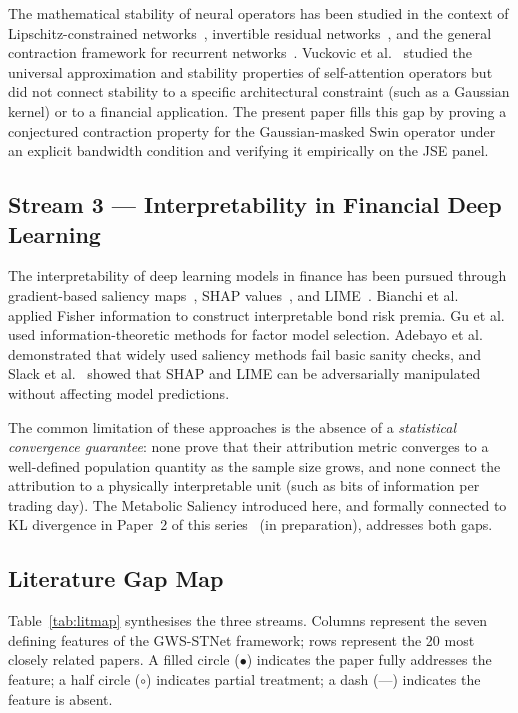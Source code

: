 \documentclass[11pt,a4paper]{article}  %
\theoremstyle{plain}
\theoremstyle{definition}
\theoremstyle{remark}
\begin{document}
The mathematical stability of neural operators has been studied
in the context of Lipschitz-constrained networks~\cite{Miyato2018},
invertible residual networks~\cite{Behrmann2019}, and the general
contraction framework for recurrent networks~\cite{Lorraine2020}.
Vuckovic et al.~\cite{Vuckovic2020} studied the universal
approximation and stability properties of self-attention operators
but did not connect stability to a specific architectural
constraint (such as a Gaussian kernel) or to a financial
application. The present paper fills this gap by proving a
conjectured contraction property for the Gaussian-masked Swin
operator under an explicit bandwidth condition and verifying
it empirically on the JSE panel.

\subsection{Stream 3 — Interpretability in Financial Deep Learning}
\label{subsec:stream3}

The interpretability of deep learning models in finance has been
pursued through gradient-based saliency maps~\cite{Selvaraju2020},
SHAP values~\cite{Lundberg2017}, and LIME~\cite{Ribeiro2016}.
Bianchi et al.~\cite{Bianchi2021} applied Fisher information to
construct interpretable bond risk premia. Gu et al.~\cite{Gu2020}
used information-theoretic methods for factor model selection.
Adebayo et al.~\cite{Adebayo2018} demonstrated that widely used
saliency methods fail basic sanity checks, and Slack et
al.~\cite{Slack2020} showed that SHAP and LIME can be adversarially
manipulated without affecting model predictions.

The common limitation of these approaches is the absence of a
\emph{statistical convergence guarantee}: none prove that their
attribution metric converges to a well-defined population quantity
as the sample size grows, and none connect the attribution to
a physically interpretable unit (such as bits of information
per trading day). The Metabolic Saliency introduced here, and
formally connected to KL divergence in Paper~2 of this
series~\cite{Moroke2026b} (in preparation), addresses both gaps.

\subsection{Literature Gap Map}
\label{subsec:gapmap}

Table~\ref{tab:litmap} synthesises the three streams. Columns
represent the seven defining features of the GWS-STNet
framework; rows represent the 20 most closely related papers.
A filled circle (\(\bullet\)) indicates the paper fully addresses
the feature; a half circle (\(\circ\)) indicates partial
treatment; a dash (---) indicates the feature is absent.
\end{document}
